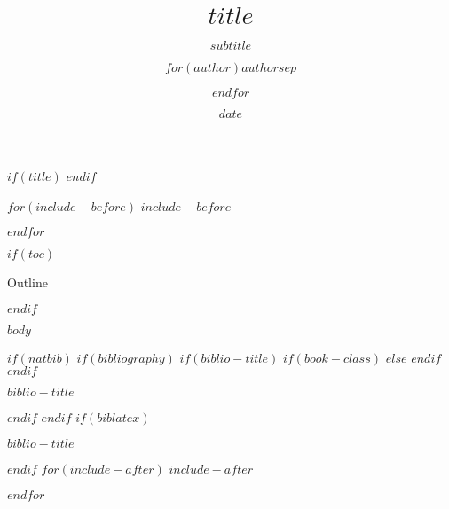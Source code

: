 \documentclass[
    $if(fontsize)$$fontsize$,$endif$
    $if(beamer)$ignorenonframetext,$endif$
    $for(classoption)$$classoption$$sep$,$endfor$]{$documentclass$}
\title{$title$}
\subtitle{$subtitle$}
\author{$for(author)$$author$$sep$ \and $endfor$}
\institute{$for(institute)$$institute$$sep$ \and $endfor$}
\date{$date$}
\begin{document}
$if(title)$
\frame{\titlepage}
$endif$

$for(include-before)$
$include-before$

$endfor$

$if(toc)$
\begin{frame}[shrink]{Outline}
\tableofcontents[hideallsubsections]
\end{frame}
$endif$

$body$

$if(natbib)$
$if(bibliography)$
$if(biblio-title)$
$if(book-class)$
\renewcommand\bibname{$biblio-title$}
$else$
\renewcommand\refname{$biblio-title$}
$endif$
$endif$
\begin{frame}[allowframebreaks]{$biblio-title$}

\end{frame}

$endif$
$endif$
$if(biblatex)$
\begin{frame}[allowframebreaks]{$biblio-title$}
\printbibliography[heading=none]
\end{frame}

$endif$
$for(include-after)$
$include-after$

$endfor$
\end{document}
